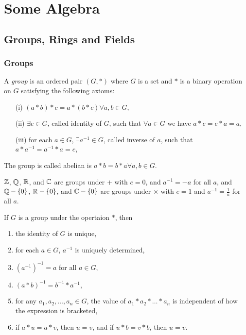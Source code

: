 \chapter{Some Algebra}

\section{Groups, Rings and Fields}

\subsection{Groups}

\begin{definition}
  A \textit{group} is an ordered pair $(G,\ast)$ where $G$ is a set and $\ast$ is a binary
  operation on $G$ satisfying the following axioms:

  \begin{itemize}
    \item[(i)]{
        $(a\ast b)\ast c=a\ast(b\ast c)\forall a,b\in G$,
      }
    \item[(ii)]{
        $\exists e\in G$, called identity of $G$, such that $\forall a\in G$ we have
        $a\ast e=e\ast a=a$,
      }
    \item[(iii)]{
        for each $a\in G$, $\exists a^{-1}\in G$, called inverse of $a$, such that
        $a\ast a^{-1}=a^{-1}\ast a=e$,
      }
  \end{itemize}

  The group is called abelian is $a\ast b=b\ast a\forall a,b\in G$. \cite{dummit}
\end{definition}

\begin{ex}
  $\mathbb{Z}$, $\mathbb{Q}$, $\mathbb{R}$, and $\mathbb{C}$ are groups under $+$ with $e=0$, and $a^{-1}=-a$ for all $a$, and
  $\mathbb{Q}-\{0\}$, $\mathbb{R}-\{0\}$, and $\mathbb{C}-\{0\}$ are groups under $\times$ with $e=1$ and
  $a^{-1}=\frac{1}{a}$ for all $a$.
\end{ex}

\begin{remark}
  If $G$ is a group under the opertaion $\ast$, then

  \begin{enumerate}
    \item{
        the identity of $G$ is unique,
      }
    \item{
        for each $a\in G$, $a^{-1}$ is uniquely determined,
      }
    \item{
        $(a^{-1})^{-1}=a$ for all $a\in G$,
      }
    \item{
        $(a\ast b)^{-1}=b^{-1}\ast a^{-1}$,
      }
    \item{
        for any $a_1,a_2,\ldots,a_n\in G$, the value of $a_1\ast a_2\ast\ldots\ast a_n$ is
        independent of how the expression is bracketed,
      }
    \item{
      if $a\ast u=a\ast v$, then $u=v$, and if $u\ast b=v\ast b$, then $u=v$.
      }
  \end{enumerate}

\end{remark}


